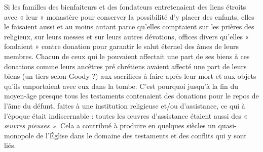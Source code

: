  Si les familles des bienfaiteurs et des fondateurs entretenaient des liens étroits avec « leur » monastère pour conserver la possibilité d'y placer des enfants, elles le faisaient aussi et au moins autant parce qu'elles comptaient sur les prières des religieux, sur leurs messes et sur leurs autres dévotions, offices divers qu'elles « fondaient » contre donation pour garantir le salut éternel des âmes de leurs membres. Chacun de ceux qui le pouvaient affectait une part de ses biens à ces donations comme leurs ancêtres pré chrétiens avaient affecté une part de leurs biens (un tiers selon Goody ?) aux sacrifices à faire après leur mort et aux objets qu'ils emportaient avec eux dans la tombe. C'est pourquoi jusqu'à la fin du moyen-âge presque tous les testaments contenaient des donations pour le repos de l'âme du défunt, faites à une institution religieuse et/ou d'assistance, ce qui à l'époque était indiscernable : toutes les œuvres d'assistance étaient aussi des « \emph{œuvres pieuses »}. Cela a contribué à produire en quelques siècles un quasi-monopole de l'Église dans le domaine des testaments et des conflits qui y sont liés.
 
 
 
